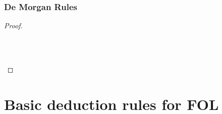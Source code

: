 \begin{multicols}{2}
%
%

\subsubsection*{De Morgan Rules}
\begin{proof}

\\	

\\	

\\	
\end{proof}
\end{multicols}

\newpage

\section{Basic deduction rules for FOL}


